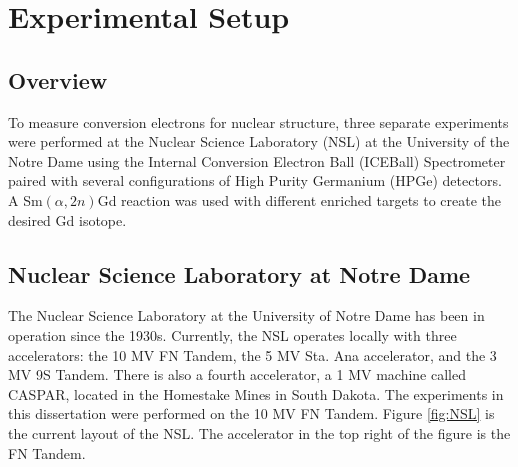 %
%
%
%
%
%
%
%
%
%


%
%

\chapter{Experimental Setup}
\label{chap:setup}

\section{Overview}

To measure conversion electrons for nuclear structure, three separate experiments were performed at the Nuclear Science Laboratory (NSL) at the University of the Notre Dame using the Internal Conversion Electron Ball (ICEBall) Spectrometer paired with several configurations of High Purity Germanium (HPGe) detectors. A Sm$(\alpha,2n)$Gd reaction was used with different enriched targets to create the desired Gd isotope.

\section{Nuclear Science Laboratory at Notre Dame}

The Nuclear Science Laboratory at the University of Notre Dame has been in operation since the 1930s. Currently, the NSL operates locally with three accelerators: the 10 MV FN Tandem, the 5 MV Sta. Ana accelerator, and the 3 MV 9S Tandem. There is also a fourth accelerator, a 1 MV machine called CASPAR, located in the Homestake Mines in South Dakota. The experiments in this dissertation were performed on the 10 MV FN Tandem. Figure \ref{fig:NSL} is the current layout of the NSL. The accelerator in the top right of the figure is the FN Tandem.

